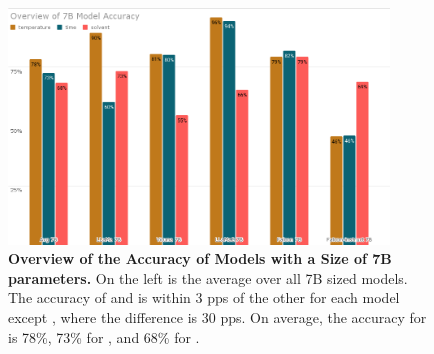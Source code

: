 \begin{figure}[!htbp]
    \begin{centering}
        \includegraphics[width=0.9\textwidth]{img/overview_7b_accuracy}
        \caption[Overview of 7B Models Accuracy]{\textbf{Overview of the Accuracy of Models with a Size of 7B parameters.}
        On the left is the average over all 7B sized models.
        The accuracy of \ttemp and \ttime is within 3 \glspl{pp} of the other for each model except , where the difference is 30 \glspl{pp}.
        On average, the accuracy for \ttemp is 78\%, 73\% for \ttime, and 68\% for \tsolv.
        }
        \label{fig:7b_acc}
    \end{centering}
\end{figure}

